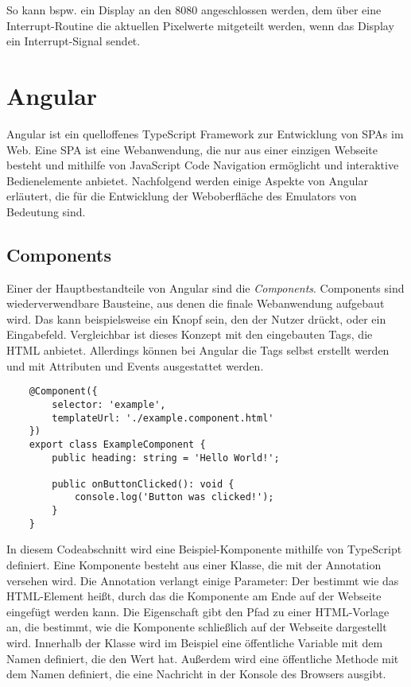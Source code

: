 So kann bspw. ein Display an den 8080 angeschlossen werden, dem über eine Interrupt-Routine die aktuellen Pixelwerte mitgeteilt werden, wenn das Display ein Interrupt-Signal sendet.

\section{Angular}

Angular ist ein quelloffenes TypeScript Framework zur Entwicklung von \acp{SPA} im Web. Eine \ac{SPA} ist eine Webanwendung, die nur aus einer einzigen Webseite besteht und mithilfe von JavaScript Code Navigation ermöglicht und interaktive Bedienelemente anbietet. Nachfolgend werden einige Aspekte von Angular erläutert, die für die Entwicklung der Weboberfläche des Emulators von Bedeutung sind.

\subsection{Components}

Einer der Hauptbestandteile von Angular sind die \textit{Components}. Components sind wiederverwendbare Bausteine, aus denen die finale Webanwendung aufgebaut wird. Das kann beispielsweise ein Knopf sein, den der Nutzer drückt, oder ein Eingabefeld. Vergleichbar ist dieses Konzept mit den eingebauten Tags, die HTML anbietet. Allerdings können bei Angular die Tags selbst erstellt werden und mit Attributen und Events ausgestattet werden.

\begin{verbatim}
    @Component({
        selector: 'example',
        templateUrl: './example.component.html'
    })
    export class ExampleComponent {
        public heading: string = 'Hello World!';
        
        public onButtonClicked(): void {
            console.log('Button was clicked!');
        }
    }
\end{verbatim}

In diesem Codeabschnitt wird eine Beispiel-Komponente mithilfe von TypeScript definiert. Eine Komponente besteht aus einer Klasse, die mit der  Annotation versehen wird. Die Annotation verlangt einige Parameter: Der  bestimmt wie das HTML-Element heißt, durch das die Komponente am Ende auf der Webseite eingefügt werden kann. Die Eigenschaft  gibt den Pfad zu einer HTML-Vorlage an, die bestimmt, wie die Komponente schließlich auf der Webseite dargestellt wird. Innerhalb der Klasse wird im Beispiel eine öffentliche Variable mit dem Namen  definiert, die den Wert  hat. Außerdem wird eine öffentliche Methode mit dem Namen  definiert, die eine Nachricht in der Konsole des Browsers ausgibt.

